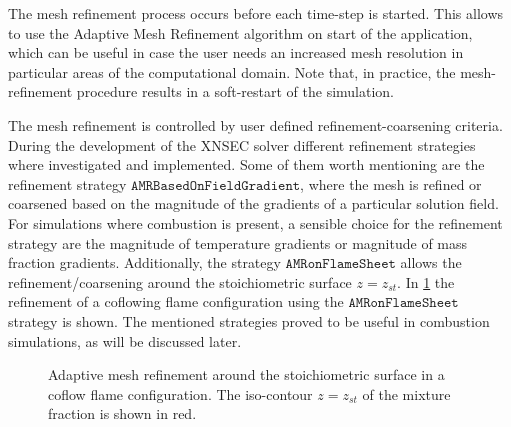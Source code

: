The mesh refinement process occurs before each time-step is started. This allows to use the Adaptive Mesh Refinement algorithm on start of the application, which can be useful in case the user needs an increased mesh resolution in particular areas of the computational domain. Note that, in practice, the mesh-refinement procedure results in a soft-restart of the simulation. 

The mesh refinement is controlled by user defined refinement-coarsening criteria. During the development of the XNSEC solver different refinement strategies where investigated and implemented. Some of them worth mentioning are the refinement strategy  $\texttt{AMRBasedOnFieldGradient}$, where the mesh is refined or coarsened based on the magnitude of the gradients of a particular solution field. For simulations where combustion is present, a sensible choice for the refinement strategy are the magnitude of temperature gradients or magnitude of mass fraction gradients. Additionally, the strategy $\texttt{AMRonFlameSheet}$ allows the refinement/coarsening around the stoichiometric surface $z = z_{st}$. In \cref{fig:CoFlowMeshStrategy} the refinement of a coflowing flame configuration using the $\texttt{AMRonFlameSheet}$ strategy is shown. The mentioned strategies proved to be useful in combustion simulations, as will be discussed later.


\begin{figure}
	\centering
	\pgfplotsset{width=0.50\textwidth, compat=1.3}
	\caption{Adaptive mesh refinement around the stoichiometric surface in a coflow flame configuration. The iso-contour $z = z_{st}$ of the mixture fraction is shown in red.}\label{fig:CoFlowMeshStrategy}
\end{figure}